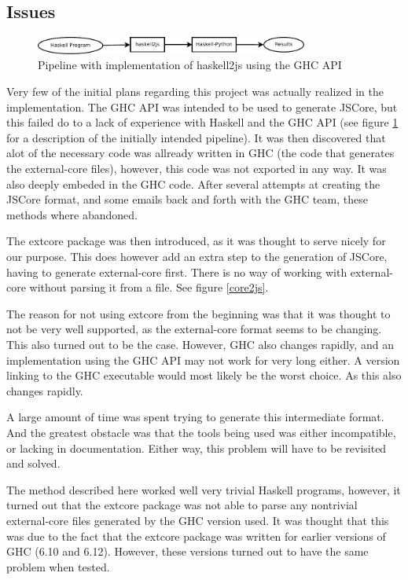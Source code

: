 \subsection{Issues}

\begin{figure}[H]
\centering
\includegraphics[width=0.8\textwidth]{diags/pipe_w_haskell2js}
\caption{Pipeline with implementation of haskell2js using the GHC API}
\label{haskell2js}
\end{figure}

Very few of the initial plans regarding this project was actually realized in the implementation.
The GHC API was intended to be used to generate JSCore, but this failed do to a lack of experience
with Haskell and the GHC API (see figure \ref{haskell2js} for a description of the initially intended
pipeline). It was then discovered that alot of the necessary code was allready
written in GHC (the code that generates the external-core files), however, this code was not 
exported in any way. It was also deeply embeded in the GHC code. After several attempts at creating
the JSCore format, and some emails back and forth with the GHC team, these methods where abandoned.

The extcore package was then introduced, as it was thought to serve nicely for our purpose. This
does however add an extra step to the generation of JSCore, having to generate external-core
first. There is no way of working with external-core without parsing it from a file. See figure \ref{core2js}.

The reason for not using extcore from the beginning was that it was thought to not be very 
well supported, as the external-core format seems to be changing. This also turned out to be
the case. However, GHC also changes rapidly, and an implementation using the GHC API may not
work for very long either. A version linking to the GHC executable would most likely be the
worst choice. As this also changes rapidly.

A large amount of time was spent trying to generate this intermediate format. And the
greatest obstacle was that the tools being used was either incompatible, or lacking in
documentation. Either way, this problem will have to be revisited and solved.

The method described here worked well very trivial Haskell programs, however, 
it turned out that
the extcore package was not able to parse any nontrivial external-core files generated 
by the GHC version used. It was thought that this was due to the fact that the extcore
package was written for earlier versions of GHC (6.10 and 6.12). However, these versions
turned out to have the same problem when tested.

